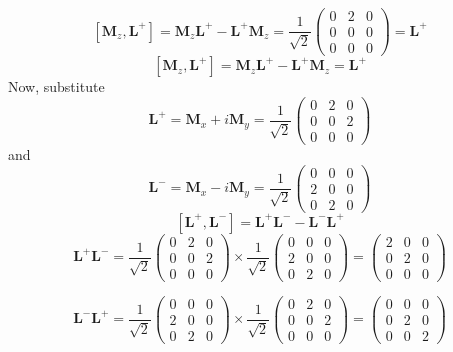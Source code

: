 $$
\left[\mathbf{M}_{z}, \mathbf{L}^{+}\right]=\mathbf{M}_{z} \mathbf{L}^{+}-\mathbf{L}^{+} \mathbf{M}_{z}=\frac{1}{\sqrt{2}}\left(\begin{array}{ccc}
0 & 2 & 0 \\
0 & 0 & 0 \\
0 & 0 & 0
\end{array}\right)=\mathbf{L}^{+}
$$
$$
\left[\mathbf{M}_{z}, \mathbf{L}^{+}\right]=\mathbf{M}_{z} \mathbf{L}^{+}-\mathbf{L}^{+} \mathbf{M}_{z}=\mathbf{L}^{+}
$$
Now, substitute 
$$
\mathbf{L}^{+}=\mathbf{M}_{x}+i \mathbf{M}_{y}=\frac{1}{\sqrt{2}}\left(\begin{array}{lll}
0 & 2 & 0 \\
0 & 0 & 2 \\
0 & 0 & 0
\end{array}\right)
$$
and
$$
\mathbf{L}^{-}=\mathbf{M}_{x}-i \mathbf{M}_{y}=\frac{1}{\sqrt{2}}\left(\begin{array}{ccc}
0 & 0 & 0 \\
2 & 0 & 0 \\
0 & 2 & 0
\end{array}\right)
$$
$$
\left[\mathbf{L}^{+}, \mathbf{L}^{-}\right]=\mathbf{L}^{+} \mathbf{L}^{-}-\mathbf{L}^{-} \mathbf{L}^{+}
$$
$$
\mathbf{L}^{+} \mathbf{L}^{-}=\frac{1}{\sqrt{2}}\left(\begin{array}{lll}
0 & 2 & 0 \\
0 & 0 & 2 \\
0 & 0 & 0
\end{array}\right) \times \frac{1}{\sqrt{2}}\left(\begin{array}{lll}
0 & 0 & 0 \\
2 & 0 & 0 \\
0 & 2 & 0
\end{array}\right)=\left(\begin{array}{lll}
2 & 0 & 0 \\
0 & 2 & 0 \\
0 & 0 & 0
\end{array}\right)
$$

$$
\mathbf{L}^{-} \mathbf{L}^{+}=\frac{1}{\sqrt{2}}\left(\begin{array}{lll}
0 & 0 & 0 \\
2 & 0 & 0 \\
0 & 2 & 0
\end{array}\right) \times \frac{1}{\sqrt{2}}\left(\begin{array}{lll}
0 & 2 & 0 \\
0 & 0 & 2 \\
0 & 0 & 0
\end{array}\right)=\left(\begin{array}{lll}
0 & 0 & 0 \\
0 & 2 & 0 \\
0 & 0 & 2
\end{array}\right)
$$


